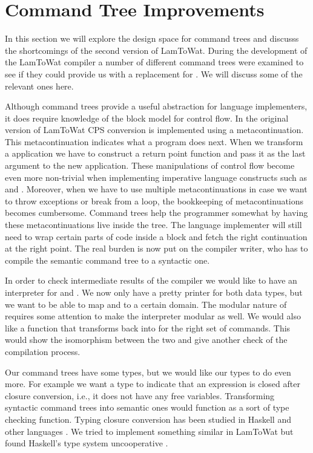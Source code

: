 \section{\label{section:ctreebetter}Command Tree Improvements}
In this section we will explore the design space for command trees and discusss the shortcomings of the second version of LamToWat. During the development of the LamToWat compiler a number of different command trees were examined to see if they could provide us with a replacement for . We will discuss some of the relevant ones here.

Although command trees provide a useful abstraction for language implementers, it does require knowledge of the block model for control flow. In the original version of LamToWat CPS conversion is implemented using a metacontinuation. This metacontinuation indicates what a program does next. When we transform a application we have to construct a return point function and pass it as the last argument to the new application. These manipulations of control flow become even more non-trivial when implementing imperative language constructs such as  and . Moreover, when we have to use multiple metacontinuations in case we want to throw exceptions or break from a  loop, the bookkeeping of metacontinuations becomes cumbersome. Command trees help the programmer somewhat by having these metacontinuations live inside the tree. The language implementer will still need to wrap certain parts of code inside a block and fetch the right continuation at the right point. The real burden is now put on the compiler writer, who has to compile the semantic command tree to a syntactic one.

In order to check intermediate results of the compiler we would like to have an interpreter for  and . We now only have a pretty printer for both data types, but we want to be able to map  and  to a certain domain. The modular nature of  requires some attention to make the interpreter modular as well. We would also like a function that transforms  back into  for the right set of commands. This would show the isomorphism between the two and give another check of the compilation process.

Our command trees have some types, but we would like our types to do even more. For example we want a type to indicate that an expression is closed after closure conversion, i.e., it does not have any free variables. Transforming syntactic command trees into semantic ones would function as a sort of type checking function. Typing closure conversion has been studied in Haskell and other languages \autocite{DBLP:conf/haskell/GuillemetteM07, DBLP:conf/pldi/Chlipala07, DBLP:conf/popl/MorrisettWCG98}. We tried to implement something similar in LamToWat but found Haskell's type system uncooperative \autocite{10.1145/2578854.2503786}.

